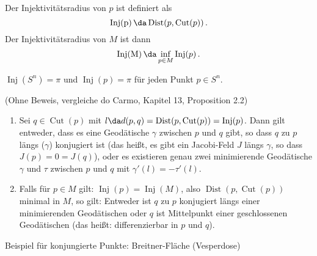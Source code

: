 \documentclass[a4paper,twoside,DIV15,BCOR12mm]{scrbook}
\DeclareMathOperator{\cut}{Cut}
\DeclareMathOperator{\inj}{Inj}
\DeclareMathOperator{\dist}{Dist}
\begin{document}
\begin{definition}
Der Injektivitätsradius von $p$ ist definiert als
\[ \operatorname{Inj(p)} \da \dist (p,\cut(p))\,. \]
Der Injektivitätsradius von $M$ ist dann
\[ \operatorname{Inj(M)} \da \inf_{p\in M} \inj (p)\,.\]
\end{definition}

\begin{beispiel}
$\inj (S^n) = \pi$ und $\inj (p) = \pi$ für jeden Punkt $p \in S^n$.
\end{beispiel}


\begin{satz}
(Ohne Beweis, vergleiche do Carmo, Kapitel 13, Proposition 2.2)

\begin{enumerate}
\item Sei $q\in \cut(p)$ mit $l\da d(p,q) = \dist (p,\cut(p)) = \inj (p)$. Dann gilt entweder, dass es eine Geodätische $\gamma$ zwischen $p$ und $q$ gibt, so dass $q$ zu $p$ längs ($\gamma$) konjugiert ist (das heißt, es gibt ein Jacobi-Feld $J$ längs $\gamma$, so dass $J(p)=0=J(q)$), oder es existieren genau zwei minimierende Geodätische $\gamma$ und $\tau$ zwischen $p$ und $q$ mit $\gamma'(l) = - \tau'(l)$.
\item Falls für $p\in M$ gilt: $\inj(p)=\inj(M)$, also $\dist(p,\cut(p))$ minimal in $M$, so gilt: Entweder ist $q$ zu $p$ konjugiert längs einer minimierenden Geodätischen oder $q$ ist Mittelpunkt einer geschlossenen Geodätischen (das heißt: differenzierbar in $p$ und $q$).
\end{enumerate}
\end{satz}

Beispiel für konjungierte Punkte: Breitner-Fläche (Vesperdose)
\end{document}
